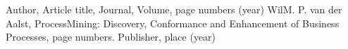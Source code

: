 \begin{thebibliography}{}
%
%
Author, Article title, Journal, Volume, page numbers (year)
WilM. P. van der Aalst, ProcessMining: Discovery, Conformance and Enhancement of Business Processes, page numbers. Publisher, place (year)
\end{thebibliography}



